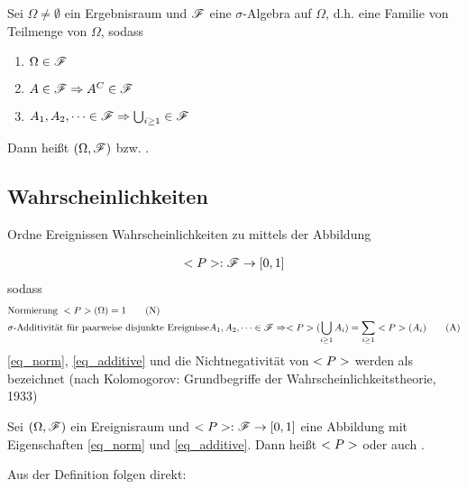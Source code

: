 \begin{definition}
	Sei $\Omega \neq \emptyset$ ein Ergebnisraum und $\mathscr{F}$ eine $\sigma$-Algebra auf $\Omega$, d.h. eine Familie von Teilmenge von $\Omega$, sodass
	\begin{enumerate}
		\item $\Omega \in \mathscr{F}$
		\item $A \in \mathscr{F} \Rightarrow A^C \in \mathscr{F}$
		\item $A_1, A_2, \dots \in \mathscr{F} \Rightarrow \bigcup_{i \ge 1} \in \mathscr{F}$
	\end{enumerate}
	Dann heißt $(\Omega, \mathscr{F})$  bzw. .
\end{definition}

\subsection*{Wahrscheinlichkeiten}

Ordne Ereignissen Wahrscheinlichkeiten zu mittels der Abbildung

\begin{align}
	<P>: \mathscr{F} \to [0,1]\notag
\end{align}
sodass
\begin{align}
	&\text{Normierung } <P>(\Omega) = 1 \label{eq_norm}\tag{N}\\
	&\sigma\text{-Additivität für paarweise disjunkte Ereignisse} 
	A_1, A_2, \dots \in \mathscr{F} \Rightarrow <P>(\bigcup_{i \ge 1} A_i) = \sum_{i \ge 1} <P>(A_i) \label{eq_additive}\tag{A}
\end{align}
\eqref{eq_norm}, \eqref{eq_additive} und die Nichtnegativität von $<P>$ werden als  bezeichnet (nach Kolomogorov: Grundbegriffe der Wahrscheinlichkeitstheorie, 1933)

\begin{definition}
	Sei $(\Omega, \mathscr{F})$ ein Ereignisraum und $<P>: \mathscr{F} \to [0,1]$ eine Abbildung mit Eigenschaften \eqref{eq_norm} und \eqref{eq_additive}. Dann heißt $<P>$  oder auch .
\end{definition}

Aus der Definition folgen direkt:

